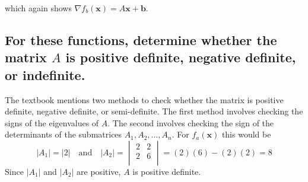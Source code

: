 \documentclass[11pt]{scrartcl}
\newcommand{\vect}{\boldsymbol}
\begin{document}
which again shows $\nabla f_b(\vect{x}) = A\vect{x} + \vect{b}$.

\subsection{For these functions, determine whether the matrix $A$ is positive definite,
negative definite, or indefinite.}
The textbook mentions two methods to check whether the matrix is positive definite, negative definite, or
semi-definite.
The first method involves checking the signs of the eigenvalues of $A$.
The second involves checking the sign of the determinants of the submatrices $A_1, A_2,\dots,A_n$.
For $f_a(\vect{x})$ this would be 
\begin{equation*}
|A_1| = |2|\quad\textrm{and}\quad |A_2| =
\begin{vmatrix}
2 & 2\\
2 & 6\\
\end{vmatrix}
= (2)(6) - (2)(2) = 8
\end{equation*}
Since $|A_1|$ and $|A_2|$ are positive, $A$ is positive definite.
\end{document}
